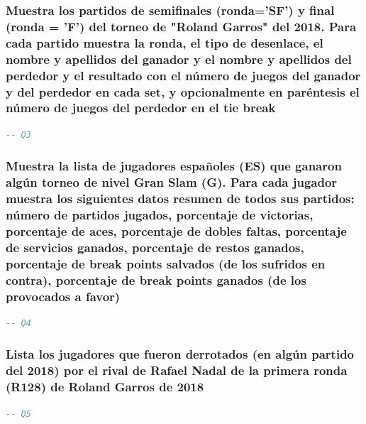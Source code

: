 \documentclass[10pt]{opticajnl}
\begin{document}
\subsubsection{Muestra los partidos de semiﬁnales (ronda='SF') y ﬁnal (ronda = 'F') del torneo de "Roland Garros" del 2018. Para cada partido muestra la ronda, el tipo de desenlace, el nombre y apellidos del ganador y el nombre y apellidos del perdedor y el resultado con el número de juegos del ganador y del perdedor en cada set, y opcionalmente en paréntesis el número de juegos del perdedor en el tie break}

\begin{lstlisting}[language=SQL]
-- Q3
\end{lstlisting}





\subsubsection{Muestra la lista de jugadores españoles (ES) que ganaron algún torneo de nivel Gran Slam (G). Para cada jugador muestra los siguientes datos resumen de todos sus partidos: número de partidos jugados, porcentaje de victorias, porcentaje de aces, porcentaje de dobles faltas, porcentaje de servicios ganados, porcentaje de restos ganados, porcentaje de break points salvados (de los sufridos en contra), porcentaje de break points ganados (de los provocados a favor)}

\begin{lstlisting}[language=SQL]
-- Q4
\end{lstlisting}





\subsubsection{Lista los jugadores que fueron derrotados (en algún partido del 2018) por el rival de Rafael Nadal de la primera ronda (R128) de Roland Garros de 2018}

\begin{lstlisting}[language=SQL]
-- Q5
\end{lstlisting}
\end{document}
